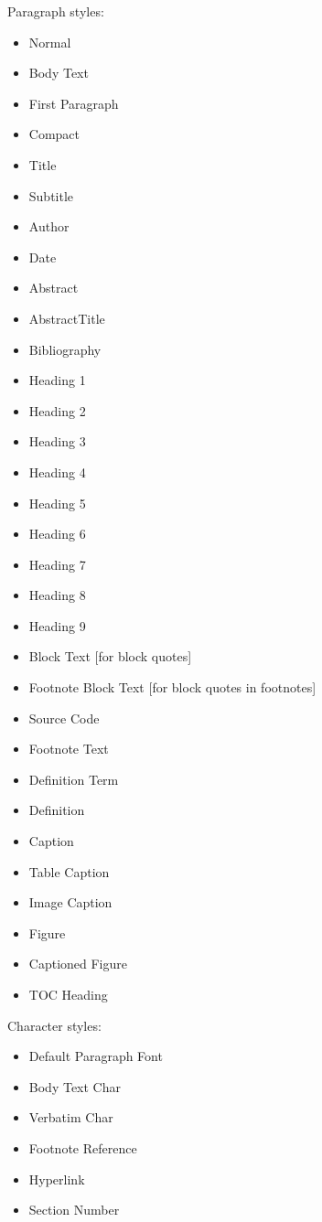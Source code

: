 \documentclass[
  b5paper
]{book}
\providecommand{\tightlist}{%
  \setlength{\itemsep}{0pt}\setlength{\parskip}{0pt}}
\begin{document}
\begin{description}
\begin{description}
Paragraph styles:

\begin{itemize}
\tightlist
\item
  Normal
\item
  Body Text
\item
  First Paragraph
\item
  Compact
\item
  Title
\item
  Subtitle
\item
  Author
\item
  Date
\item
  Abstract
\item
  AbstractTitle
\item
  Bibliography
\item
  Heading 1
\item
  Heading 2
\item
  Heading 3
\item
  Heading 4
\item
  Heading 5
\item
  Heading 6
\item
  Heading 7
\item
  Heading 8
\item
  Heading 9
\item
  Block Text {[}for block quotes{]}
\item
  Footnote Block Text {[}for block quotes in footnotes{]}
\item
  Source Code
\item
  Footnote Text
\item
  Definition Term
\item
  Definition
\item
  Caption
\item
  Table Caption
\item
  Image Caption
\item
  Figure
\item
  Captioned Figure
\item
  TOC Heading
\end{itemize}

Character styles:

\begin{itemize}
\tightlist
\item
  Default Paragraph Font
\item
  Body Text Char
\item
  Verbatim Char
\item
  Footnote Reference
\item
  Hyperlink
\item
  Section Number
\end{itemize}


\end{description}
\end{description}
\end{document}
